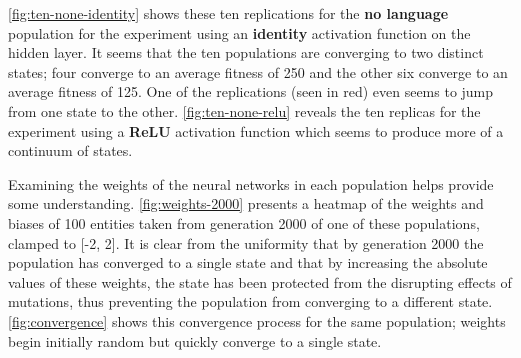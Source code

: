 \documentclass[12pt,a4paper]{report}
\begin{document}
\cref{fig:ten-none-identity} shows these ten replications for the {\bf no language} population for the experiment using an {\bf identity} activation function on the hidden layer. It seems that the ten populations are converging to two distinct states; four converge to an average fitness of 250 and the other six converge to an average fitness of 125. One of the replications (seen in red) even seems to jump from one state to the other. \cref{fig:ten-none-relu} reveals the ten replicas for the experiment using a {\bf ReLU} activation function which seems to produce more of a continuum of states.

Examining the weights of the neural networks in each population helps provide some understanding. \cref{fig:weights-2000} presents a heatmap of the weights and biases of 100 entities taken from generation 2000 of one of these populations, clamped to [-2, 2]. It is clear from the uniformity that by generation 2000 the population has converged to a single state and that by increasing the absolute values of these weights, the state has been protected from the disrupting effects of mutations, thus preventing the population from converging to a different state. \cref{fig:convergence} shows this convergence process for the same population; weights begin initially random but quickly converge to a single state.
\end{document}
